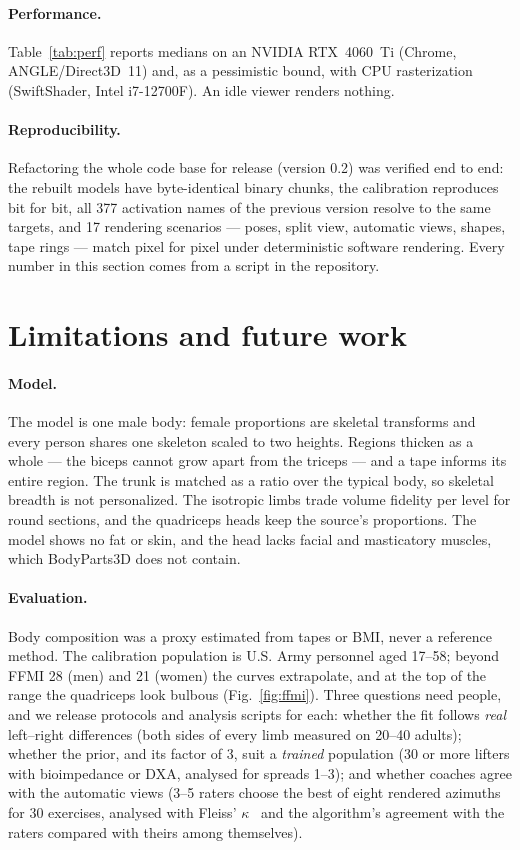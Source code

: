 \documentclass[10pt,twocolumn]{article}
\begin{document}
\paragraph{Performance.}
Table~\ref{tab:perf} reports medians on an NVIDIA RTX~4060~Ti (Chrome, ANGLE/Direct3D~11) and, as a
pessimistic bound, with CPU rasterization (SwiftShader, Intel i7-12700F). An idle viewer renders
nothing.

\paragraph{Reproducibility.}
Refactoring the whole code base for release (version 0.2) was verified end to end: the rebuilt models
have byte-identical binary chunks, the calibration reproduces bit for bit, all 377 activation names of
the previous version resolve to the same targets, and 17 rendering scenarios --- poses, split view,
automatic views, shapes, tape rings --- match pixel for pixel under deterministic software
rendering. Every number in this section comes from a script in the repository.

\section{Limitations and future work}\label{sec:limits}

\paragraph{Model.} The model is one male body: female proportions are skeletal transforms and every
person shares one skeleton scaled to two heights. Regions thicken as a whole --- the biceps cannot
grow apart from the triceps --- and a tape informs its entire region. The trunk is matched as a ratio
over the typical body, so skeletal breadth is not personalized. The isotropic limbs trade volume
fidelity per level for round sections, and the quadriceps heads keep the source's proportions. The
model shows no fat or skin, and the head lacks facial and masticatory muscles, which BodyParts3D
does not contain.

\paragraph{Evaluation.} Body composition was a proxy estimated from tapes or BMI, never a reference
method. The calibration population is U.S. Army personnel aged 17--58; beyond FFMI 28 (men) and 21
(women) the curves extrapolate, and at the top of the range the quadriceps look bulbous
(Fig.~\ref{fig:ffmi}). Three questions need people, and we release protocols and analysis scripts
for each: whether the fit follows \emph{real} left--right differences (both sides of every limb
measured on 20--40 adults); whether the prior, and its factor of 3, suit a \emph{trained} population
(30 or more lifters with bioimpedance or DXA, analysed for spreads 1--3); and whether coaches agree
with the automatic views (3--5 raters choose the best of eight rendered azimuths for 30 exercises,
analysed with Fleiss' $\kappa$~\cite{fleiss1971kappa} and the algorithm's agreement with the raters
compared with theirs among themselves).
\end{document}
